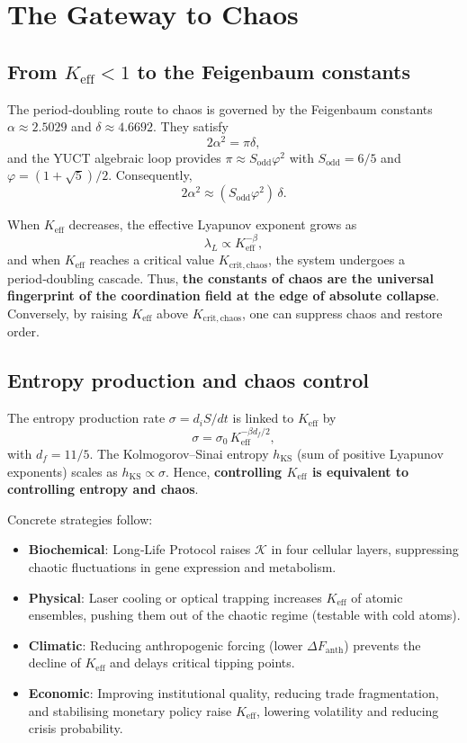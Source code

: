 \documentclass[12pt,a4paper]{article}
\newcommand{\Keff}{K_{\mathrm{eff}}}
\newcommand{\REL}{\mathcal{K}}
\begin{document}
	\section{The Gateway to Chaos}
	
	\subsection{From $\Keff < 1$ to the Feigenbaum constants}
	
	The period‑doubling route to chaos is governed by the Feigenbaum constants
	$\alpha \approx 2.5029$ and $\delta \approx 4.6692$. They satisfy
	\[
	2\alpha^2 = \pi \delta,
	\]
	and the YUCT algebraic loop provides $\pi \approx S_{\mathrm{odd}}\varphi^2$ with
	$S_{\mathrm{odd}}=6/5$ and $\varphi = (1+\sqrt{5})/2$. Consequently,
	\[
	2\alpha^2 \approx (S_{\mathrm{odd}}\varphi^2)\,\delta.
	\]
	
	When $\Keff$ decreases, the effective Lyapunov exponent grows as
	\[
	\lambda_L \propto \Keff^{-\beta},
	\]
	and when $\Keff$ reaches a critical value $K_{\mathrm{crit,chaos}}$, the system
	undergoes a period‑doubling cascade. Thus, \textbf{the constants of chaos are the
		universal fingerprint of the coordination field at the edge of absolute collapse}.
	Conversely, by raising $\Keff$ above $K_{\mathrm{crit,chaos}}$, one can suppress
	chaos and restore order.
	
	\subsection{Entropy production and chaos control}
	
	The entropy production rate $\sigma = d_iS/dt$ is linked to $\Keff$ by
	\[
	\sigma = \sigma_0\, \Keff^{-\beta d_f/2},
	\]
	with $d_f = 11/5$. The Kolmogorov–Sinai entropy $h_{\mathrm{KS}}$ (sum of positive
	Lyapunov exponents) scales as $h_{\mathrm{KS}} \propto \sigma$. Hence,
	\textbf{controlling $\Keff$ is equivalent to controlling entropy and chaos}.
	
	Concrete strategies follow:
	\begin{itemize}
		\item \textbf{Biochemical}: Long‑Life Protocol raises $\REL$ in four cellular layers,
		suppressing chaotic fluctuations in gene expression and metabolism.
		\item \textbf{Physical}: Laser cooling or optical trapping increases $\Keff$ of atomic
		ensembles, pushing them out of the chaotic regime (testable with cold atoms).
		\item \textbf{Climatic}: Reducing anthropogenic forcing (lower $\Delta F_{\mathrm{anth}}$)
		prevents the decline of $\Keff$ and delays critical tipping points.
		\item \textbf{Economic}: Improving institutional quality, reducing trade fragmentation,
		and stabilising monetary policy raise $\Keff$, lowering volatility and reducing
		crisis probability.
	\end{itemize}
	
\end{document}
